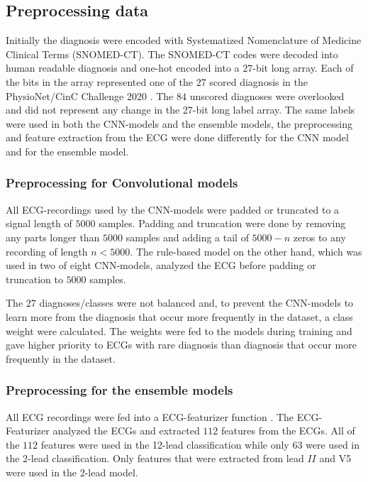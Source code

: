 \subsection{Preprocessing data}
Initially the diagnosis were encoded with Systematized Nomenclature of Medicine Clinical Terms (SNOMED-CT). The SNOMED-CT codes were decoded into human readable diagnosis and one-hot encoded into a $27$-bit long array. Each of the bits in the array represented one of the $27$ scored diagnosis in the PhysioNet/CinC Challenge 2020 \cite{alday_classification_2020}. The $84$ unscored diagnoses were overlooked and did not represent any change in the 27-bit long label array. The same labels were used in both the CNN-models and the ensemble models, the preprocessing and feature extraction from the ECG were done differently for the CNN model and for the ensemble model.

\subsubsection{Preprocessing for Convolutional models} \hfill \break
All ECG-recordings used by the CNN-models were padded or truncated to a signal length of $5000$ samples. Padding and truncation were done by removing any parts longer than $5000$ samples and adding a tail of $5000 - n$ zeros to any recording of length $n<5000$. The rule-based model on the other hand, which was used in two of eight CNN-models, analyzed the ECG before padding or truncation to $5000$ samples.

The $27$ diagnoses/classes were not balanced and, to prevent the CNN-models to learn more from the diagnosis that occur more frequently in the dataset, a class weight were calculated. The weights were fed to the models during training and gave higher priority to ECGs with rare diagnosis than diagnosis that occur more frequently in the dataset. 

\subsubsection{Preprocessing for the ensemble models}\hfill \break
All ECG recordings were fed into a ECG-featurizer function \cite{bjorn-jostein_singstad_ecg-featurizer_nodate}. The ECG-Featurizer analyzed the ECGs and extracted $112$ features from the ECGs. All of the $112$ features were used in the 12-lead classification while only $63$ were used in the 2-lead classification. Only features that were extracted from lead $II$ and V5 were used in the 2-lead model.

